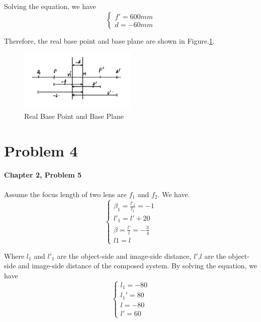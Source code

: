 \documentclass{article}
\begin{document}
Solving the equation, we have
\begin{equation}
    \begin{cases}
        f'=600mm \\
        d=-60mm
    \end{cases}
\end{equation}

Therefore, the real base point and base plane are shown in Figure.\ref{fig:real_base_point}.
\begin{figure}[H]
    \centering
    \includegraphics[width=0.5\textwidth]{image/hw2/hw2_2_2.jpeg}
    \caption{Real Base Point and Base Plane}
    \label{fig:real_base_point}
\end{figure}

\section{Problem 4}
\textbf{Chapter 2, Problem 5}\\\\

Assume the focus length of two lens are $f_1$ and $f_2$. We have.
\begin{equation}
    \begin{cases}
        \beta_1 = \frac{l'_1}{l_1}  = -1    \\
        l'_1 = l'+20                        \\
        \beta = \frac{l'}{l} = -\frac{3}{4} \\
        l1 = l
    \end{cases}
\end{equation}

Where $l_1$ and $l'_1$ are the object-side and image-side distance, $l'$,$l$ are the object-side and image-side distance of the composed system.
By solving the equation, we have
\begin{equation}
    \begin{cases}
        l_1 = -80 \\
        l_1' = 80 \\
        l = -80   \\
        l' = 60
    \end{cases}
\end{equation}
\end{document}
